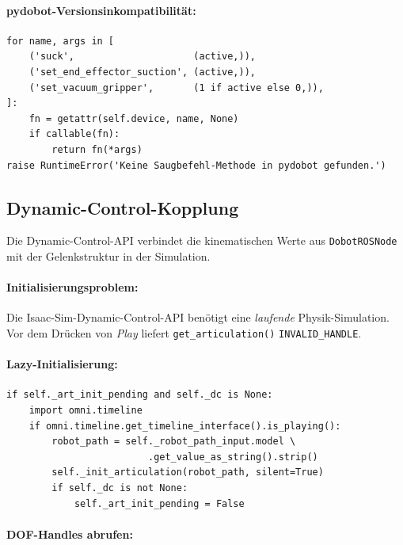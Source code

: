 \documentclass[11pt,a4paper]{article}
\begin{document}
\paragraph{pydobot-Versionsinkompatibilität:}
\begin{lstlisting}[caption={Suction-Fallback-Mechanismus in set\_suction()}]
for name, args in [
    ('suck',                     (active,)),
    ('set_end_effector_suction', (active,)),
    ('set_vacuum_gripper',       (1 if active else 0,)),
]:
    fn = getattr(self.device, name, None)
    if callable(fn):
        return fn(*args)
raise RuntimeError('Keine Saugbefehl-Methode in pydobot gefunden.')
\end{lstlisting}

\subsection{Dynamic-Control-Kopplung}
\label{sec:dc}

Die Dynamic-Control-API verbindet die kinematischen Werte aus
\texttt{DobotROSNode} mit der Gelenkstruktur in der Simulation.

\paragraph{Initialisierungsproblem:}
Die Isaac-Sim-Dynamic-Control-API benötigt eine \emph{laufende}
Physik-Simulation. Vor dem Drücken von \emph{Play} liefert
\texttt{get\_articulation()} \texttt{INVALID\_HANDLE}.

\paragraph{Lazy-Initialisierung:}

\begin{lstlisting}[caption={Lazy DC-Init in \_on\_update()}]
if self._art_init_pending and self._dc is None:
    import omni.timeline
    if omni.timeline.get_timeline_interface().is_playing():
        robot_path = self._robot_path_input.model \
                         .get_value_as_string().strip()
        self._init_articulation(robot_path, silent=True)
        if self._dc is not None:
            self._art_init_pending = False
\end{lstlisting}

\paragraph{DOF-Handles abrufen:}
\end{document}
